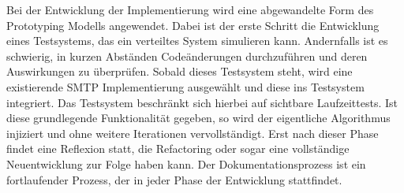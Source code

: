 Bei der Entwicklung der Implementierung wird eine abgewandelte Form des Prototyping Modells  angewendet. Dabei ist der erste Schritt die Entwicklung eines Testsystems, das ein verteiltes System simulieren kann. Andernfalls ist es schwierig, in kurzen Abständen Codeänderungen durchzuführen und deren Auswirkungen zu überprüfen. Sobald dieses Testsystem steht, wird eine existierende SMTP Implementierung ausgewählt und diese ins Testsystem integriert. Das Testsystem beschränkt sich hierbei auf sichtbare Laufzeittests. Ist diese grundlegende Funktionalität gegeben, so wird der eigentliche Algorithmus injiziert und ohne weitere Iterationen vervollständigt. Erst nach dieser Phase findet eine Reflexion statt, die Refactoring oder sogar eine vollständige Neuentwicklung zur Folge haben kann. Der Dokumentationsprozess ist ein fortlaufender Prozess, der in jeder Phase der Entwicklung stattfindet.


